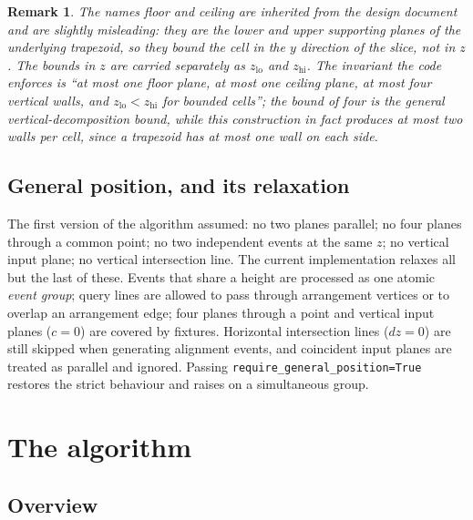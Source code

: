\documentclass[11pt]{article}
\newtheorem{remark}{Remark}
\begin{document}
\begin{remark}
The names \emph{floor} and \emph{ceiling} are inherited from the design
document and are slightly misleading: they are the lower and upper supporting
planes of the underlying \emph{trapezoid}, so they bound the cell in the $y$
direction of the slice, not in $z$.  The bounds in $z$ are carried separately as
$z_{\mathrm{lo}}$ and $z_{\mathrm{hi}}$.  The invariant the code enforces is
``at most one floor plane, at most one ceiling plane, at most four vertical
walls, and $z_{\mathrm{lo}} < z_{\mathrm{hi}}$ for bounded cells''; the bound of
four is the general vertical-decomposition bound, while this construction in
fact produces at most two walls per cell, since a trapezoid has at most one
wall on each side.
\end{remark}

\subsection{General position, and its relaxation}

The first version of the algorithm assumed: no two planes parallel; no four
planes through a common point; no two independent events at the same $z$; no
vertical input plane; no vertical intersection line.  The current
implementation relaxes all but the last of these.  Events that share a height
are processed as one atomic \emph{event group}; query lines are allowed to pass
through arrangement vertices or to overlap an arrangement edge; four planes
through a point and vertical input planes ($c = 0$) are covered by fixtures.
Horizontal intersection lines ($dz = 0$) are still skipped when generating
alignment events, and coincident input planes are treated as parallel and
ignored.  Passing \verb|require_general_position=True| restores the strict
behaviour and raises on a simultaneous group.

\section{The algorithm}
\label{sec:algorithm}

\subsection{Overview}
\end{document}
